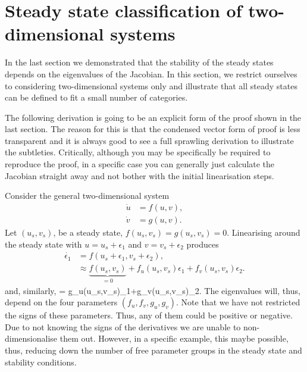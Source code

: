 \section{Steady state classification of two-dimensional systems}
In the last section we demonstrated that the stability of the steady states depends on the eigenvalues of the Jacobian. In this section, we restrict ourselves to considering two-dimensional systems only and illustrate that all steady states can be defined to fit a small number of categories.

The following derivation is going to be an explicit form of the proof shown in the last section. The reason for this is that the condensed vector form of proof is less transparent and it is always good to see a full sprawling derivation to illustrate the subtleties. Critically, although you may be specifically be required to reproduce the proof, in a specific case you can generally just calculate the Jacobian straight away and not bother with the initial linearisation steps.

Consider the general two-dimensional system
\begin{align}
\dot{u}&=f(u,v),\\
\dot{v}&=g(u,v).
\end{align}
Let $(u_s,v_s)$, be a steady state, \ie $f(u_s,v_s)=g(u_s,v_s)=0$. Linearising around the steady state with $u=u_s+\epsilon_1$ and $v=v_s+\epsilon_2$ produces
\begin{align}
\dot{\epsilon_1}&= f(u_s+\epsilon_1,v_s+\epsilon_2),\nonumber\\
&\approx \underbrace{f(u_s,v_s)}_{=0}+f_u(u_s,v_s)\epsilon_1+f_v(u_s,v_s)\epsilon_2.\label{Two_d_f}
\end{align}
and, similarly,
\bb
{}= g_u(u_s,v_s)\epsilon_1+g_v(u_s,v_s)\epsilon_2.\label{Two_d_g}
\ee
The eigenvalues will, thus, depend on the four parameters $(f_u,f_v,g_u,g_v)$. Note that we have not restricted the signs of these parameters. Thus, any of them could be positive or negative. Due to not knowing the signs of the derivatives we are unable to non-dimensionalise them out. However, in a specific example, this maybe possible, thus, reducing down the number of free parameter groups in the steady state and stability conditions.

